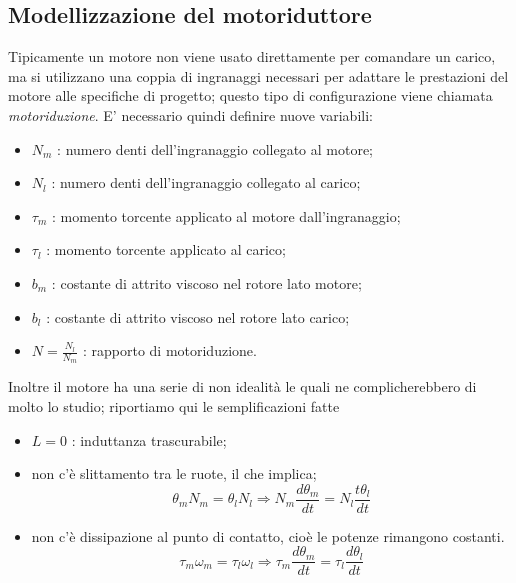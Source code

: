 	\subsection{Modellizzazione del motoriduttore}
	\label{subsec:ModellizzazioneMotoriduttore}
	
		Tipicamente un motore non viene usato direttamente per comandare un carico, ma si utilizzano una coppia di ingranaggi necessari per adattare le prestazioni del motore alle specifiche di progetto; questo tipo di configurazione viene chiamata \textit{motoriduzione}. E' necessario quindi definire nuove variabili:
	
		\begin{itemize}
			\item $N_m$ : numero denti dell'ingranaggio collegato al motore;
			\item $N_l$ : numero denti dell'ingranaggio collegato al carico;
			\item $\tau_m$ : momento torcente applicato al motore dall'ingranaggio;
			\item $\tau_l$ : momento torcente applicato al carico;
			\item $b_m$ : costante di attrito viscoso nel rotore lato motore;
			\item $b_l$ : costante di attrito viscoso nel rotore lato carico;
			\item $N = \frac{N_l}{N_m}$ : rapporto di motoriduzione.
		\end{itemize}  
	
		\noindent Inoltre il motore ha una serie di non idealità le quali ne complicherebbero di molto lo studio; riportiamo qui le semplificazioni fatte
	
		\begin{itemize}
			\item $L = 0$ : induttanza trascurabile;
			\item non c'è slittamento tra le ruote, il che implica;
			\begin{equation}
				\theta_mN_m = \theta_lN_l \Longrightarrow N_m\frac{d\theta_m}{dt}=N_l\frac{t\theta_l}{dt}
				\label{eq:nonIdealità1}
			\end{equation}
			\item non c'è dissipazione al punto di contatto, cioè le potenze rimangono costanti.
			\begin{equation}
				\tau_m\omega_m=\tau_l\omega_l \Longrightarrow \tau_m\frac{d\theta_m}{dt}=\tau_l\frac{d\theta_l}{dt}
				\label{eq:nonIdealità2}  
			\end{equation}
		\end{itemize}
	

